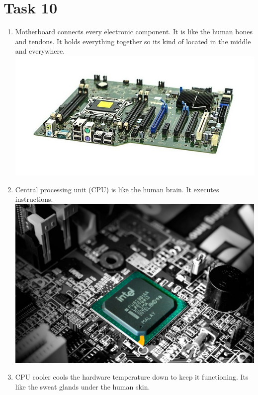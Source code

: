 \documentclass{article}
\begin{document}
\section {Task 10}
\begin{enumerate}
	\item Motherboard connects every electronic component. It is like the human bones and tendons. It holds everything together so its kind of located in the middle and everywhere.
	\includegraphics[width=\textwidth,height=\textheight,keepaspectratio]{motherboard}
	\item Central processing unit (CPU) is like the human brain. It executes instructions.
	\includegraphics[width=\textwidth,height=\textheight,keepaspectratio]{cpu}
	\item CPU cooler cools the hardware temperature down to keep it functioning. Its like the sweat glands under the human skin.

\end{enumerate}
\end{document}
